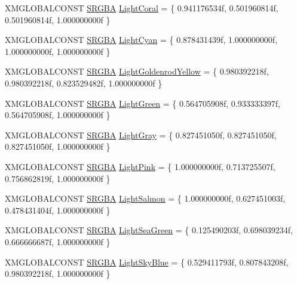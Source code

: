 \begin{DoxyCompactItemize}
X\+M\+G\+L\+O\+B\+A\+L\+C\+O\+N\+ST \hyperlink{structmage_1_1_s_r_g_b_a}{S\+R\+G\+BA} \hyperlink{namespacemage_1_1color_a9e6cb84106511e85d1eebaf3ad65b743}{Light\+Coral} = \{ 0.\+941176534f, 0.\+501960814f, 0.\+501960814f, 1.\+000000000f \}
\item 
X\+M\+G\+L\+O\+B\+A\+L\+C\+O\+N\+ST \hyperlink{structmage_1_1_s_r_g_b_a}{S\+R\+G\+BA} \hyperlink{namespacemage_1_1color_ad0b871f45576f7616c34b17b7210b5ea}{Light\+Cyan} = \{ 0.\+878431439f, 1.\+000000000f, 1.\+000000000f, 1.\+000000000f \}
\item 
X\+M\+G\+L\+O\+B\+A\+L\+C\+O\+N\+ST \hyperlink{structmage_1_1_s_r_g_b_a}{S\+R\+G\+BA} \hyperlink{namespacemage_1_1color_a8b371a0d67368c8fa056de880b6fb418}{Light\+Goldenrod\+Yellow} = \{ 0.\+980392218f, 0.\+980392218f, 0.\+823529482f, 1.\+000000000f \}
\item 
X\+M\+G\+L\+O\+B\+A\+L\+C\+O\+N\+ST \hyperlink{structmage_1_1_s_r_g_b_a}{S\+R\+G\+BA} \hyperlink{namespacemage_1_1color_ac0cc82492983e41085eec8cb1dce68c0}{Light\+Green} = \{ 0.\+564705908f, 0.\+933333397f, 0.\+564705908f, 1.\+000000000f \}
\item 
X\+M\+G\+L\+O\+B\+A\+L\+C\+O\+N\+ST \hyperlink{structmage_1_1_s_r_g_b_a}{S\+R\+G\+BA} \hyperlink{namespacemage_1_1color_a6af6bd3be5ccf3d69dc1635bfb2dc8d5}{Light\+Gray} = \{ 0.\+827451050f, 0.\+827451050f, 0.\+827451050f, 1.\+000000000f \}
\item 
X\+M\+G\+L\+O\+B\+A\+L\+C\+O\+N\+ST \hyperlink{structmage_1_1_s_r_g_b_a}{S\+R\+G\+BA} \hyperlink{namespacemage_1_1color_a4269e5358f4edf08ae4b740c22b014e0}{Light\+Pink} = \{ 1.\+000000000f, 0.\+713725507f, 0.\+756862819f, 1.\+000000000f \}
\item 
X\+M\+G\+L\+O\+B\+A\+L\+C\+O\+N\+ST \hyperlink{structmage_1_1_s_r_g_b_a}{S\+R\+G\+BA} \hyperlink{namespacemage_1_1color_a1dee89ee5a62d0b75f332a32a5bcf89e}{Light\+Salmon} = \{ 1.\+000000000f, 0.\+627451003f, 0.\+478431404f, 1.\+000000000f \}
\item 
X\+M\+G\+L\+O\+B\+A\+L\+C\+O\+N\+ST \hyperlink{structmage_1_1_s_r_g_b_a}{S\+R\+G\+BA} \hyperlink{namespacemage_1_1color_a29e3751890e54b12a1d323847cdce8d4}{Light\+Sea\+Green} = \{ 0.\+125490203f, 0.\+698039234f, 0.\+666666687f, 1.\+000000000f \}
\item 
X\+M\+G\+L\+O\+B\+A\+L\+C\+O\+N\+ST \hyperlink{structmage_1_1_s_r_g_b_a}{S\+R\+G\+BA} \hyperlink{namespacemage_1_1color_a1de72837fb064b35cb6860e6f155a48a}{Light\+Sky\+Blue} = \{ 0.\+529411793f, 0.\+807843208f, 0.\+980392218f, 1.\+000000000f \}
\item 

\end{DoxyCompactItemize}
